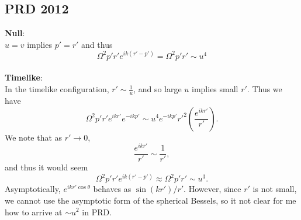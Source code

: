 \documentclass[10pt,letterpaper]{article}
\begin{document}
\subsection*{PRD 2012}
\textbf{Null}:\\
$u=v$ implies $p'=r'$ and thus
\begin{equation}
\Omega^2 p'r' e^{ik(r'-p')} = \Omega^2 p'r' \sim u^4
\end{equation}
\\
\textbf{Timelike}:\\
In the timelike configuration, $r'\sim \frac1u$, and so large $u$ implies small $r'$. Thus we have
\begin{equation}
\Omega^2 p'r' e^{ikr'}e^{-ikp'} \sim u^4  e^{-ikp'} r'^2 \left( \frac{e^{ikr'}}{r'}\right ).
\end{equation}
We note that as $r'\to 0$,
\begin{equation}
 \frac{e^{ikr'}}{r'} \sim \frac{1}{r'},
\end{equation}
and thus it would seem 
\begin{equation}
\Omega^2 p'r' e^{ik(r'-p')}\approx \Omega^2 p' r'\sim u^3.
\end{equation}
Asymptotically, $e^{ikr'\cos\theta}$ behaves as $\sin(kr')/r'$. However, since $r'$ is not small, we cannot use the asymptotic form of the spherical Bessels, so it not clear for me how to arrive at $\sim u^2$ in PRD.
\end{document}
